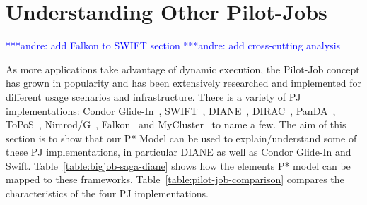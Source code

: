 \documentclass[conference,final]{IEEEtran}
\newcommand{\jhanote}[1]{ {\textcolor{red} { ***shantenu: #1 }}}
\newcommand{\alnote}[1]{ {\textcolor{blue} { ***andre: #1 }}}
\newcommand{\alnote}[1]{}
\newcommand{\jhanote}[1]{}
\newcommand{\upp}{\vspace*{-0.5em}}
\begin{document}
\section{Understanding Other Pilot-Jobs\upp\upp}
\alnote{add Falkon to SWIFT section}
\alnote{add cross-cutting analysis}




As more applications take advantage of dynamic execution, the Pilot-Job concept
has grown in popularity and has been extensively researched and implemented for
different usage scenarios and infrastructure. There is a variety of PJ
implementations: Condor Glide-In~\cite{condor-g}, SWIFT~\cite{Wilde2011},
DIANE~\cite{Moscicki:908910}, DIRAC~\cite{1742-6596-219-6-062049},
PanDA~\cite{1742-6596-219-6-062041}, ToPoS~\cite{topos},
Nimrod/G~\cite{10.1109/HPC.2000.846563}, Falkon~\cite{1362680} and
MyCluster~\cite{1652061} to name a few. The aim of this section is to show that
our P* Model can be used to explain/understand some of these PJ implementations,
in particular DIANE as well as Condor Glide-In and Swift.
Table~\ref{table:bigjob-saga-diane} shows how the elements P* model can be
mapped to these frameworks. Table~\ref{table:pilot-job-comparison} compares the
characteristics of the four PJ implementations.
\end{document}
